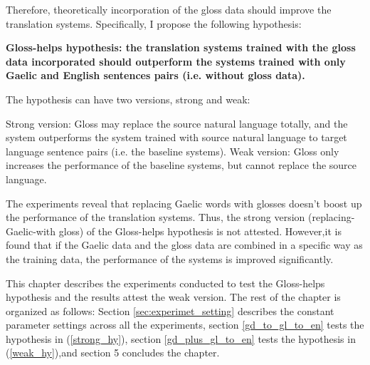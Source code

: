 \documentclass[a4paper]{article}
\begin{document}
Therefore, theoretically incorporation of the gloss data should improve the translation systems. Specifically, I propose the following hypothesis:
\begin{exe}  
\ex \textbf{Gloss-helps hypothesis: the translation systems trained with the gloss data incorporated should outperform the systems trained with only Gaelic and English sentences pairs (i.e. without gloss data).}

The hypothesis can have two versions, strong and weak:
	\begin{xlist}
	\ex \label{strong_hy} Strong version: Gloss may replace the source natural language totally, and the system outperforms the system trained with source natural language to target language sentence pairs (i.e. the baseline systems).   
	\ex \label{weak_hy} Weak version: Gloss only increases the performance of the baseline systems, but cannot replace the source language. 
	\end{xlist}
\end{exe}

The experiments reveal that replacing Gaelic words with glosses doesn't boost up the performance of the translation systems. Thus, the strong version (replacing-Gaelic-with gloss) of the Gloss-helps hypothesis is not attested. However,it is found that if the Gaelic data and the gloss data are combined in a specific way as the training data, the performance of the systems is improved significantly.  

This chapter describes the experiments conducted to test the Gloss-helps hypothesis and the results attest the weak version. 
The rest of the chapter is organized as follows: Section \ref{sec:experimet_setting} describes the constant parameter settings across all the experiments, section \ref{gd_to_gl_to_en} tests the hypothesis in (\ref{strong_hy}), section \ref{gd_plus_gl_to_en} tests the hypothesis in (\ref{weak_hy}),and section 5 concludes the chapter.  

\end{document}
